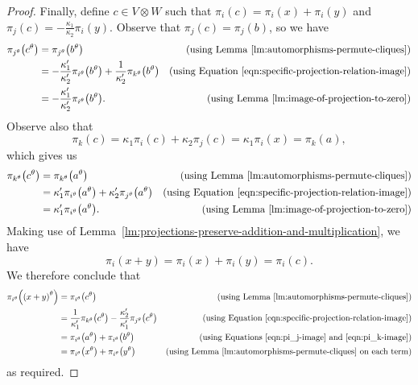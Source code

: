\documentclass[ALCO, Unicode]{cedram}
\begin{document}
\begin{proof}
Finally, define $c \in V \otimes W$ such that $\pi_i{\left(c \right)} = \pi_i{\left(x \right)} + \pi_i{\left(y \right)}$ and $\pi_j{\left(c \right)} = -\frac{\kappa_1}{\kappa_2} \pi_i{\left(y \right)}$. Observe that $\pi_j{\left(c \right)} = \pi_j{\left(b \right)}$, so we have
\begin{align}
    \pi_{j^\theta}{\left(c^\theta \right)} &= \pi_{j^\theta}{\left(b^\theta \right)} & \text{(using Lemma~\ref{lm:automorphisms-permute-cliques})} \notag \\
    &= -\frac{\kappa'_1}{\kappa'_2} \pi_{i^\theta}{\left(b^\theta \right)} + \frac{1}{\kappa'_2} \pi_{k^\theta}{\left(b^\theta \right)} & \text{(using Equation \eqref{eqn:specific-projection-relation-image})} \notag \\
    &= -\frac{\kappa'_1}{\kappa'_2} \pi_{i^\theta}{\left(b^\theta \right)}. & \text{(using Lemma~\ref{lm:image-of-projection-to-zero})} \label{eqn:pi_j-image}
\end{align}
Observe also that
\begin{displaymath}
    \pi_k{\left(c \right)} = \kappa_1 \pi_i{\left(c \right)} + \kappa_2 \pi_j{\left(c \right)} = \kappa_1 \pi_i{\left(x \right)} = \pi_k{\left(a \right)},
\end{displaymath}
which gives us
\begin{align}
    \pi_{k^\theta}{\left(c^\theta \right)} &= \pi_{k^\theta}{\left(a^\theta \right)} & \text{(using Lemma~\ref{lm:automorphisms-permute-cliques})} \notag \\
    &= \kappa'_1 \pi_{i^\theta}{\left(a^\theta \right)} + \kappa'_2 \pi_{j^\theta}{\left(a^\theta \right)} & \text{(using Equation \eqref{eqn:specific-projection-relation-image})} \notag \\
    &= \kappa'_1 \pi_{i^\theta}{\left(a^\theta \right)}. & \text{(using Lemma~\ref{lm:image-of-projection-to-zero})} \label{eqn:pi_k-image}
\end{align}
Making use of Lemma~\ref{lm:projections-preserve-addition-and-multiplication}, we have
\begin{displaymath}
    \pi_i{\left(x + y \right)} = \pi_i{\left(x \right)} + \pi_i{\left(y \right)} = \pi_i{\left(c \right)}.
\end{displaymath}
We therefore conclude that
\begin{align*}
    \pi_{i^\theta}{\left(\left(x + y \right)^\theta \right)}
    &= \pi_{i^\theta}{\left(c^\theta \right)} & \text{(using Lemma~\ref{lm:automorphisms-permute-cliques})} \\
    &= \frac{1}{\kappa'_1} \pi_{k^\theta}{\left(c^\theta \right)} -\frac{\kappa'_2}{\kappa'_1} \pi_{j^\theta}{\left(c^\theta \right)} & \text{(using Equation \eqref{eqn:specific-projection-relation-image})} \\
    &= \pi_{i^\theta}{\left(a^\theta \right)} + \pi_{i^\theta}{\left(b^\theta \right)} & \text{(using Equations \eqref{eqn:pi_j-image} and \eqref{eqn:pi_k-image})} \\
    &= \pi_{i^\theta}{\left(x^\theta \right)} + \pi_{i^\theta}{\left(y^\theta \right)} & \text{(using Lemma~\ref{lm:automorphisms-permute-cliques} on each term)}
\end{align*}
as required.
\end{proof}
\end{document}
